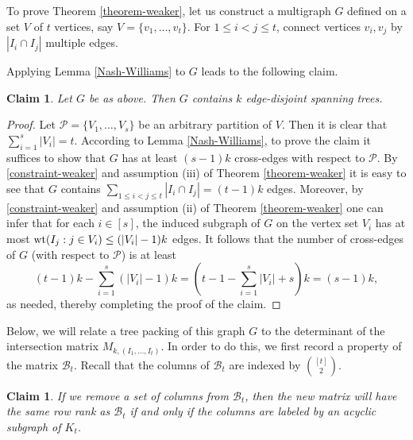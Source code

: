\documentclass[11pt]{article}
\newtheorem{claim}[theorem]{Claim}
\newcommand{\wt}{{\rm wt}}
\begin{document}
To prove Theorem \ref{theorem-weaker}, let us construct a multigraph $G$ defined on a set $V$ of $t$ vertices, say $V=\{v_1,\ldots,v_t\}$. For $1\le i<j\le t$, connect vertices $v_i,v_j$ by $|I_i\cap I_j|$ multiple edges.

Applying Lemma \ref{Nash-Williams} to $G$ leads to the following claim.

\begin{claim}\label{claim-spanning-tree}
Let $G$ be as above.  Then
$G$ contains $k$ edge-disjoint spanning trees.
\end{claim}

\begin{proof}
Let $\mathcal{P}=\{V_1,\ldots,V_s\}$ be an arbitrary partition of $V$. Then it is clear that $\sum_{i=1}^s |V_i|=t$. According to Lemma \ref{Nash-Williams}, to prove the claim it suffices to show that $G$ has at least $(s-1)k$ cross-edges with respect to $\mathcal{P}$. By \eqref{constraint-weaker} and assumption (iii) of Theorem \ref{theorem-weaker} it is easy to see that $G$ contains $\sum_{1\le i<j\le t}|I_i\cap I_j|=(t-1)k$ edges. Moreover, by \eqref{constraint-weaker} and assumption (ii) of Theorem \ref{theorem-weaker} one can infer that for each $i\in[s]$, the induced subgraph of $G$ on the vertex set $V_i$ has at most $\wt(I_j:j\in V_i)\le (|V_i|-1)k$ edges. It follows that the number of cross-edges of $G$ (with respect to $\mathcal{P}$) is at least
$$
(t-1)k-\sum_{i=1}^s (|V_i|-1)k=\left(t-1-\sum_{i=1}^s |V_i|+s\right)k=(s-1)k,
$$
as needed, thereby completing the proof of the claim.
\end{proof}

Below, we will relate a tree packing of this graph $G$ to the determinant of the intersection matrix $M_{k,(I_1, \ldots, I_t)}$.  In order to do this, we first record
a property of the matrix $\mathcal{B}_t$.  Recall that the columns of $\mathcal{B}_t$ are indexed by ${[t] \choose 2}$.

\begin{claim}\label{claim-property-of-B_t}
If we remove a set of columns from $\mathcal{B}_t$, then the new matrix will have the same row rank as $\mathcal{B}_t$ if and only if the columns are labeled by an acyclic subgraph of $K_t$.
\end{claim}
\end{document}
